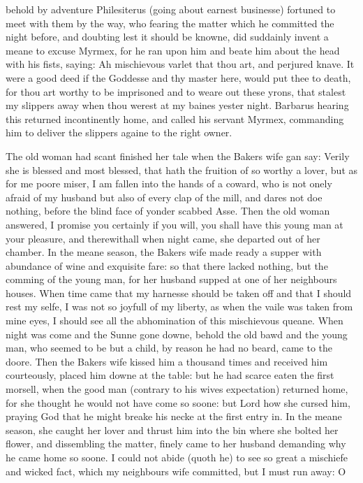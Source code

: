 behold by adventure Philesiterus (going about earnest businesse) fortuned to
meet with them by the way, who fearing the matter which he committed the night
before, and doubting lest it should be knowne, did suddainly invent a meane to
excuse Myrmex, for he ran upon him and beate him about the head with his fists,
saying: Ah mischievous varlet that thou art, and perjured knave. It were a good
deed if the Goddesse and thy master here, would put thee to death, for thou art
worthy to be imprisoned and to weare out these yrons, that stalest my slippers
away when thou werest at my baines yester night. Barbarus hearing this returned
incontinently home, and called his servant Myrmex, commanding him to deliver
the slippers againe to the right owner.

The old woman had scant finished her tale when the Bakers wife gan say: Verily
she is blessed and most blessed, that hath the fruition of so worthy a lover,
but as for me poore miser, I am fallen into the hands of a coward, who is not
onely afraid of my husband but also of every clap of the mill, and dares not
doe nothing, before the blind face of yonder scabbed Asse. Then the old woman
answered, I promise you certainly if you will, you shall have this young man at
your pleasure, and therewithall when night came, she departed out of her
chamber. In the meane season, the Bakers wife made ready a supper with
abundance of wine and exquisite fare: so that there lacked nothing, but the
comming of the young man, for her husband supped at one of her neighbours
houses. When time came that my harnesse should be taken off and that I should
rest my selfe, I was not so joyfull of my liberty, as when the vaile was taken
from mine eyes, I should see all the abhomination of this mischievous queane.
When night was come and the Sunne gone downe, behold the old bawd and the young
man, who seemed to be but a child, by reason he had no beard, came to the
doore. Then the Bakers wife kissed him a thousand times and received him
courteously, placed him downe at the table: but he had scarce eaten the first
morsell, when the good man (contrary to his wives expectation) returned home,
for she thought he would not have come so soone: but Lord how she cursed him,
praying God that he might breake his necke at the first entry in. In the meane
season, she caught her lover and thrust him into the bin where she bolted her
flower, and dissembling the matter, finely came to her husband demanding why he
came home so soone. I could not abide (quoth he) to see so great a mischiefe
and wicked fact, which my neighbours wife committed, but I must run away: O
